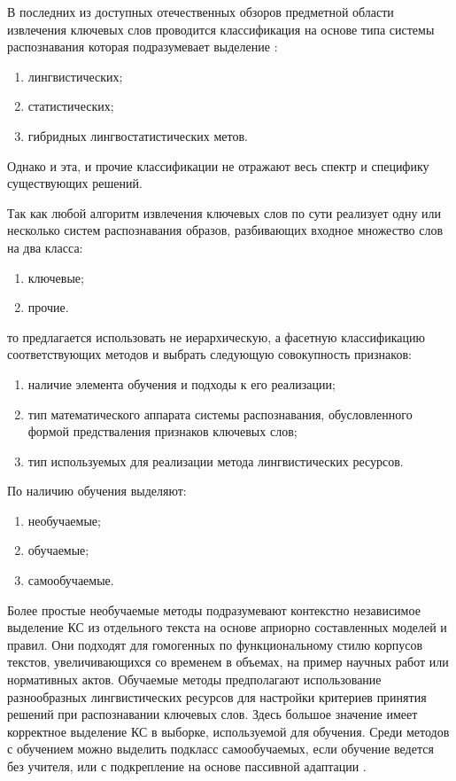 В последних из доступных отечественных обзоров предметной области извлечения ключевых слов проводится классификация на основе типа системы распознавания которая подразумевает выделение \cite{7}:
\begin{enumerate}
	\item лингвистических;
	\item статистических;
	\item гибридных лингвостатистических метов.
\end{enumerate}

Однако и эта, и прочие классификации не отражают весь спектр и специфику существующих решений.

Так как любой алгоритм извлечения ключевых слов по сути реализует одну или несколько систем распознавания образов, разбивающих входное множество слов на два класса:
\begin{enumerate}
	\item ключевые;
	\item прочие.
\end{enumerate}

то предлагается использовать не иерархическую, а фасетную классификацию соответствующих методов и выбрать следующую совокупность признаков:
\begin{enumerate}
	\item наличие элемента обучения и подходы к его реализации;
	\item тип математического аппарата системы распознавания, обусловленного формой предстваления признаков ключевых слов;
	\item тип используемых для реализации метода лингвистических ресурсов.
\end{enumerate}

По наличию обучения выделяют:
\begin{enumerate}
	\item необучаемые;
	\item обучаемые;
	\item самообучаемые. 
\end{enumerate}
Более простые необучаемые методы подразумевают контекстно независимое выделение КС из отдельного текста на основе априорно составленных моделей и правил. 
Они подходят для гомогенных по функциональному стилю корпусов текстов, увеличивающихся со временем в объемах, на пример научных работ или нормативных актов.
Обучаемые методы предполагают использование разнообразных лингвистических ресурсов для настройки критериев принятия решений при распознавании ключевых слов.
Здесь большое значение имеет корректное выделение КС в выборке, используемой для обучения.
Среди методов с обучением можно выделить подкласс самообучаемых, если обучение ведется без учителя, или с подкрепление на основе пассивной адаптации \cite{20}.

